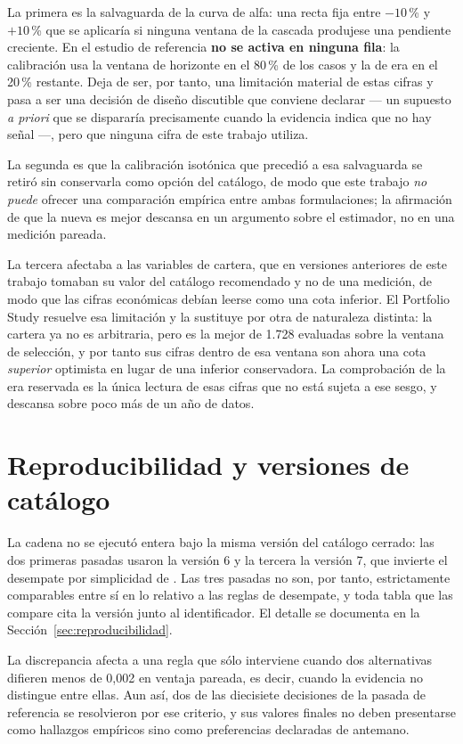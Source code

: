 La primera es la salvaguarda de la curva de alfa: una recta fija entre $-10$\,\% y $+10$\,\% que se
aplicaría si ninguna ventana de la cascada produjese una pendiente creciente. En el estudio de
referencia \textbf{no se activa en ninguna fila}: la calibración usa la ventana de horizonte en el
80\,\% de los casos y la de era en el 20\,\% restante. Deja de ser, por tanto, una limitación
material de estas cifras y pasa a ser una decisión de diseño discutible que conviene declarar ---
un supuesto \emph{a priori} que se dispararía precisamente cuando la evidencia indica que no hay
señal ---, pero que ninguna cifra de este trabajo utiliza.

La segunda es que la calibración isotónica que precedió a esa salvaguarda se retiró sin conservarla
como opción del catálogo, de modo que este trabajo \emph{no puede} ofrecer una comparación empírica
entre ambas formulaciones; la afirmación de que la nueva es mejor descansa en un argumento sobre el
estimador, no en una medición pareada.

La tercera afectaba a las variables de cartera, que en versiones anteriores de este trabajo tomaban
su valor del catálogo recomendado y no de una medición, de modo que las cifras económicas debían
leerse como una cota inferior. El Portfolio Study resuelve esa limitación y la sustituye por otra de
naturaleza distinta: la cartera ya no es arbitraria, pero es la mejor de 1.728 evaluadas sobre la
ventana de selección, y por tanto sus cifras dentro de esa ventana son ahora una cota \emph{superior}
optimista en lugar de una inferior conservadora. La comprobación de la era reservada es la única
lectura de esas cifras que no está sujeta a ese sesgo, y descansa sobre poco más de un año de datos.

\section{Reproducibilidad y versiones de catálogo}

La cadena no se ejecutó entera bajo la misma versión del catálogo cerrado: las dos primeras pasadas
usaron la versión 6 y la tercera la versión 7, que invierte el desempate por simplicidad de
. Las tres pasadas no son, por tanto, estrictamente comparables entre
sí en lo relativo a las reglas de desempate, y toda tabla que las compare cita la versión junto al
identificador. El detalle se documenta en la Sección~\ref{sec:reproducibilidad}.

La discrepancia afecta a una regla que sólo interviene cuando dos alternativas difieren menos de
0,002 en ventaja pareada, es decir, cuando la evidencia no distingue entre ellas. Aun así, dos de
las diecisiete decisiones de la pasada de referencia se resolvieron por ese criterio, y sus valores
finales no deben presentarse como hallazgos empíricos sino como preferencias declaradas de antemano.
